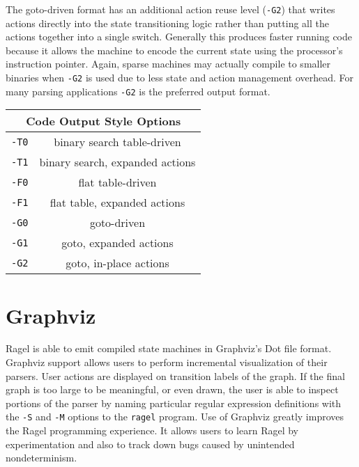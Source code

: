 \documentclass[letterpaper,11pt,oneside]{book}
\newcommand{\verbspace}{\vspace{10pt}}
\begin{document}
The goto-driven format has an additional action reuse level (\verb|-G2|) that
writes actions directly into the state transitioning logic rather than putting
all the actions together into a single switch. Generally this produces faster
running code because it allows the machine to encode the current state using
the processor's instruction pointer. Again, sparse machines may actually
compile to smaller binaries when \verb|-G2| is used due to less state and
action management overhead. For many parsing applications \verb|-G2| is the
preferred output format.

\verbspace
\begin{center}
\begin{tabular}{|c|c|}
\hline
\multicolumn{2}{|c|}{\bf Code Output Style Options} \\
\hline
\verb|-T0|&binary search table-driven\\
\hline
\verb|-T1|&binary search, expanded actions\\
\hline
\verb|-F0|&flat table-driven\\
\hline
\verb|-F1|&flat table, expanded actions\\
\hline
\verb|-G0|&goto-driven\\
\hline
\verb|-G1|&goto, expanded actions\\
\hline
\verb|-G2|&goto, in-place actions\\
\hline
\end{tabular}
\end{center}

\section{Graphviz}

Ragel is able to emit compiled state machines in Graphviz's Dot file format.
Graphviz support allows users to perform
incremental visualization of their parsers. User actions are displayed on
transition labels of the graph. If the final graph is too large to be
meaningful, or even drawn, the user is able to inspect portions of the parser
by naming particular regular expression definitions with the \verb|-S| and
\verb|-M| options to the \verb|ragel| program. Use of Graphviz greatly
improves the Ragel programming experience. It allows users to learn Ragel by
experimentation and also to track down bugs caused by unintended
nondeterminism.
\end{document}
